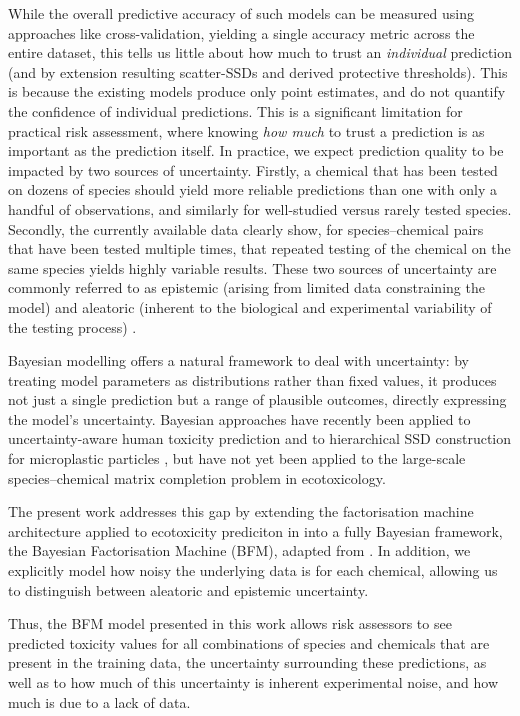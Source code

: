 While the overall predictive accuracy of such models can be measured using approaches like cross-validation, yielding a single accuracy metric across the entire dataset, this tells us little about how much to trust an \textit{individual} prediction (and by extension resulting scatter-SSDs and derived protective thresholds). This is because the  existing models produce only point estimates, and do not quantify the confidence of individual predictions. This is a significant limitation for practical risk assessment, where knowing \textit{how much} to trust a prediction is as important as the prediction itself. In practice, we expect prediction quality to be impacted by two sources of uncertainty. Firstly, a chemical that has been tested on dozens of species should yield more reliable predictions than one with only a handful of observations, and similarly for well-studied versus rarely tested species. Secondly, the currently available data clearly show, for species--chemical pairs that have been tested multiple times, that repeated testing of the chemical on the same species yields highly variable results. These two sources of uncertainty are commonly referred to as epistemic (arising from limited data constraining the model) and aleatoric (inherent to the biological and experimental variability of the testing process) \cite{epistemicaleatoric}.

Bayesian modelling offers a natural framework to deal with uncertainty: by treating model parameters as distributions rather than fixed values, it produces not just a single prediction but a range of plausible outcomes, directly expressing the model's uncertainty. Bayesian approaches have recently been applied to uncertainty-aware human toxicity prediction \cite{von2026uncertainty} and to hierarchical SSD construction for microplastic particles \cite{iwasaki2026bayesian}, but have not yet been applied to the large-scale species--chemical matrix completion problem in ecotoxicology.

The present work addresses this gap by extending the factorisation machine architecture applied to ecotoxicity prediciton in \citet{PosthumaImprovingHazard} into a fully Bayesian framework, the Bayesian Factorisation Machine (BFM), adapted from \citet{rendle2011bayesian}. In addition, we explicitly model how noisy the underlying data is for each chemical, allowing us to distinguish between aleatoric and epistemic uncertainty.

Thus, the BFM model presented in this work allows risk assessors to see predicted toxicity values for all combinations of species and chemicals that are present in the training data, the uncertainty surrounding these predictions, as well as to how much of this uncertainty is inherent experimental noise, and how much is due to a lack of data.


